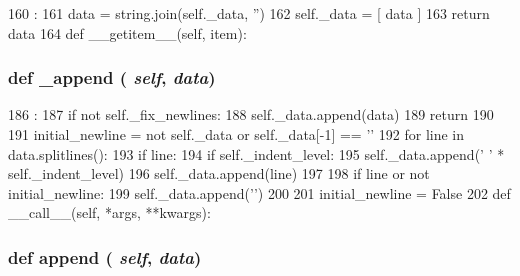 \begin{DoxyCode}
160                      :
161         data = string.join(self._data, '')
162         self._data = [ data ]
163         return data
164 
    def __getitem__(self, item):
\end{DoxyCode}
\hypertarget{classm5_1_1util_1_1code__formatter_1_1code__formatter_a390a34f39790d0e031ed841449561551}{
\subsubsection[{\_\-append}]{\setlength{\rightskip}{0pt plus 5cm}def \_\-append ( {\em self}, \/   {\em data})}}
\label{classm5_1_1util_1_1code__formatter_1_1code__formatter_a390a34f39790d0e031ed841449561551}



\begin{DoxyCode}
186                            :
187         if not self._fix_newlines:
188             self._data.append(data)
189             return
190 
191         initial_newline = not self._data or self._data[-1] == '\n'
192         for line in data.splitlines():
193             if line:
194                 if self._indent_level:
195                     self._data.append(' ' * self._indent_level)
196                 self._data.append(line)
197 
198             if line or not initial_newline:
199                 self._data.append('\n')
200 
201             initial_newline = False
202 
    def __call__(self, *args, **kwargs):
\end{DoxyCode}
\hypertarget{classm5_1_1util_1_1code__formatter_1_1code__formatter_a69e6c03a1e37f0277f464db19e5fd985}{
\subsubsection[{append}]{\setlength{\rightskip}{0pt plus 5cm}def append ( {\em self}, \/   {\em data})}}
\label{classm5_1_1util_1_1code__formatter_1_1code__formatter_a69e6c03a1e37f0277f464db19e5fd985}



